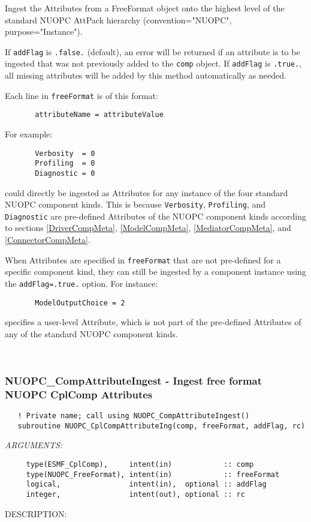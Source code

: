      Ingest the Attributes from a FreeFormat object onto the highest level
     of the standard NUOPC AttPack hierarchy (convention="NUOPC", 
     purpose="Instance").
   
     If {\tt addFlag} is {\tt .false.} (default), an error will be returned if 
     an attribute is to be ingested that was not previously added to the 
     {\tt comp} object. If {\tt addFlag} is {\tt .true.}, all missing attributes
     will be added by this method automatically as needed.
  
     Each line in {\tt freeFormat} is of this format:
  
     \begin{verbatim}
       attributeName = attributeValue
     \end{verbatim}
  
     For example:
     \begin{verbatim}
       Verbosity  = 0
       Profiling  = 0
       Diagnostic = 0
     \end{verbatim}
     could directly be ingested as Attributes for any instance of the four 
     standard NUOPC component kinds. This is because {\tt Verbosity},
     {\tt Profiling}, and {\tt Diagnostic} are pre-defined Attributes of the 
     NUOPC component kinds according to sections \ref{DriverCompMeta}, 
     \ref{ModelCompMeta}, \ref{MediatorCompMeta}, and \ref{ConnectorCompMeta}.
  
     When Attributes are specified in {\tt freeFormat} that are not pre-defined
     for a specific component kind, they can still be ingested by a component
     instance using the {\tt addFlag=.true.} option. For instance:
     \begin{verbatim}
       ModelOutputChoice = 2
     \end{verbatim}
     specifies a user-level Attribute, which is not part of the pre-defined 
     Attributes of any of the standard NUOPC component kinds.
   
 
\mbox{}\hrulefill\ 
 
\subsubsection [NUOPC\_CompAttributeIngest] {NUOPC\_CompAttributeIngest - Ingest free format NUOPC CplComp Attributes}


\begin{verbatim}   ! Private name; call using NUOPC_CompAttributeIngest() 
   subroutine NUOPC_CplCompAttributeIng(comp, freeFormat, addFlag, rc)\end{verbatim}{\em ARGUMENTS:}
\begin{verbatim}     type(ESMF_CplComp),     intent(in)            :: comp
     type(NUOPC_FreeFormat), intent(in)            :: freeFormat
     logical,                intent(in),  optional :: addFlag
     integer,                intent(out), optional :: rc\end{verbatim}
{\sf DESCRIPTION:\\ }


